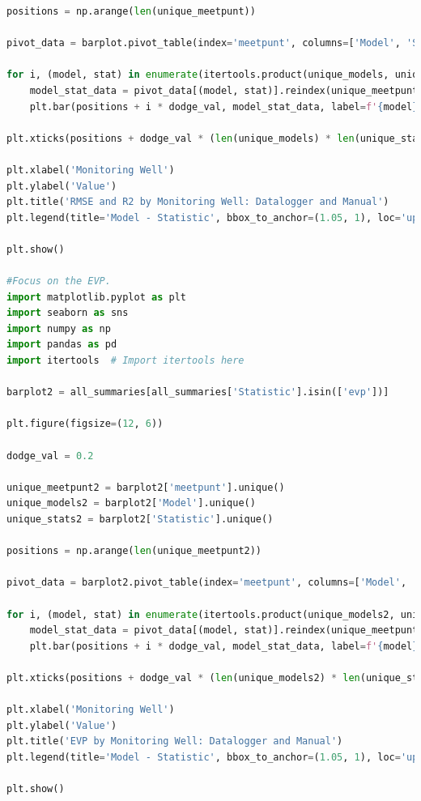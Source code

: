 \begin{lstlisting}[language=Python]
positions = np.arange(len(unique_meetpunt))

pivot_data = barplot.pivot_table(index='meetpunt', columns=['Model', 'Statistic'], values='Value', fill_value=0)

for i, (model, stat) in enumerate(itertools.product(unique_models, unique_stats)):
    model_stat_data = pivot_data[(model, stat)].reindex(unique_meetpunt, fill_value=0)
    plt.bar(positions + i * dodge_val, model_stat_data, label=f'{model} - {stat}', width=dodge_val)

plt.xticks(positions + dodge_val * (len(unique_models) * len(unique_stats) - 1) / 2, unique_meetpunt, rotation=45)

plt.xlabel('Monitoring Well')
plt.ylabel('Value')
plt.title('RMSE and R2 by Monitoring Well: Datalogger and Manual')
plt.legend(title='Model - Statistic', bbox_to_anchor=(1.05, 1), loc='upper left')

plt.show()

#Focus on the EVP.
import matplotlib.pyplot as plt
import seaborn as sns
import numpy as np
import pandas as pd
import itertools  # Import itertools here

barplot2 = all_summaries[all_summaries['Statistic'].isin(['evp'])]

plt.figure(figsize=(12, 6))

dodge_val = 0.2

unique_meetpunt2 = barplot2['meetpunt'].unique()
unique_models2 = barplot2['Model'].unique()
unique_stats2 = barplot2['Statistic'].unique()

positions = np.arange(len(unique_meetpunt2))

pivot_data = barplot2.pivot_table(index='meetpunt', columns=['Model', 'Statistic'], values='Value', fill_value=0)

for i, (model, stat) in enumerate(itertools.product(unique_models2, unique_stats2)):
    model_stat_data = pivot_data[(model, stat)].reindex(unique_meetpunt2, fill_value=0)
    plt.bar(positions + i * dodge_val, model_stat_data, label=f'{model} - {stat}', width=dodge_val)

plt.xticks(positions + dodge_val * (len(unique_models2) * len(unique_stats2) - 1) / 2, unique_meetpunt2, rotation=45)

plt.xlabel('Monitoring Well')
plt.ylabel('Value')
plt.title('EVP by Monitoring Well: Datalogger and Manual')
plt.legend(title='Model - Statistic', bbox_to_anchor=(1.05, 1), loc='upper left')

plt.show()


\end{lstlisting}
